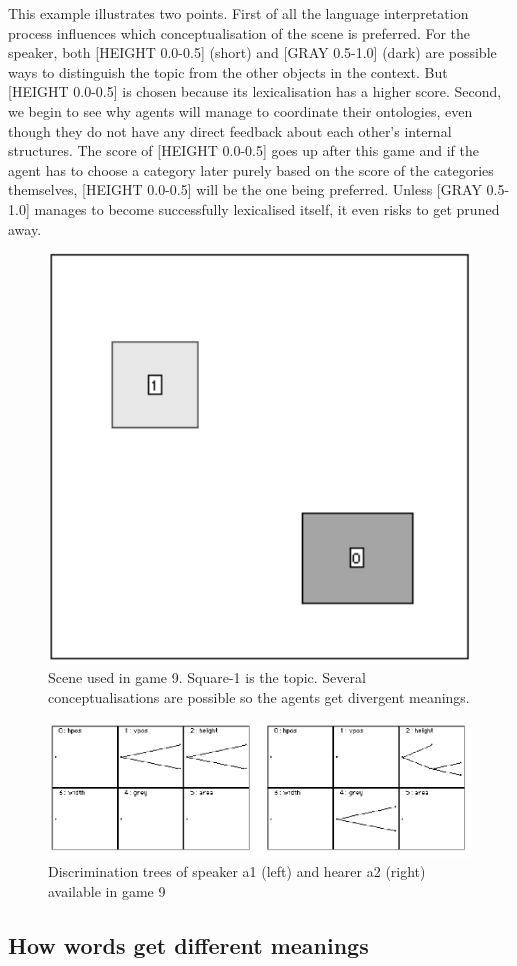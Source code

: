 This example illustrates two points. First of all the 
language interpretation process influences 
which conceptualisation of the scene is preferred. For 
the speaker, both [HEIGHT 0.0-0.5] (short) and [GRAY 0.5-1.0]
(dark) are possible ways to distinguish the topic from the 
other objects in the context. But [HEIGHT 0.0-0.5] is 
chosen because its lexicalisation has a higher score. 
Second, we begin to see why agents will manage to 
coordinate their ontologies, even though they do not 
have any direct feedback about each other's internal 
structures. The score of [HEIGHT 0.0-0.5] goes up after
this game and if the 
agent has to choose a category later purely based on 
the score of the categories themselves, [HEIGHT 0.0-0.5] will 
be the one being preferred. Unless [GRAY 0.5-1.0] manages
to become successfully lexicalised itself, it even risks to 
get pruned away. 
\begin{figure}[htbp]
  \centerline{\includegraphics[width=.40\textwidth]{chap6/figs/scene-game9}}
\caption{\label{game9} Scene used
in game 9. Square-1 is the topic. Several conceptualisations are 
possible so the agents get divergent meanings.}
\end{figure}
\begin{figure}[htbp]
  \centerline{\includegraphics[width=.80\textwidth]{chap6/figs/discri-game9}}
\caption{\label{discri-game9} Discrimination trees
of speaker a1 (left) and hearer a2 (right) available 
in game 9}
\end{figure}

\subsection{How words get different meanings}

